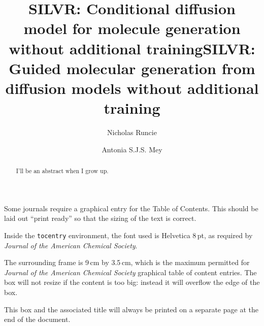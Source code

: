 \documentclass[journal=jacsat,manuscript=article]{achemso}
\author{Nicholas Runcie}
\author{Antonia S.J.S. Mey}
\title[SILVR: Molecular Generation for binding modes]
  {SILVR: Conditional diffusion model for molecule generation without additional training}
\title[SILVR: Molecular Generation for binding modes]
  {SILVR: Guided molecular generation from diffusion models without additional training}
\begin{document}
\begin{tocentry}

Some journals require a graphical entry for the Table of Contents.
This should be laid out ``print ready'' so that the sizing of the
text is correct.

Inside the \texttt{tocentry} environment, the font used is Helvetica
8\,pt, as required by \emph{Journal of the American Chemical
Society}.

The surrounding frame is 9\,cm by 3.5\,cm, which is the maximum
permitted for  \emph{Journal of the American Chemical Society}
graphical table of content entries. The box will not resize if the
content is too big: instead it will overflow the edge of the box.

This box and the associated title will always be printed on a
separate page at the end of the document.

\end{tocentry}

\begin{abstract}
I'll be an abstract when I grow up. 
\end{abstract}

\end{document}
